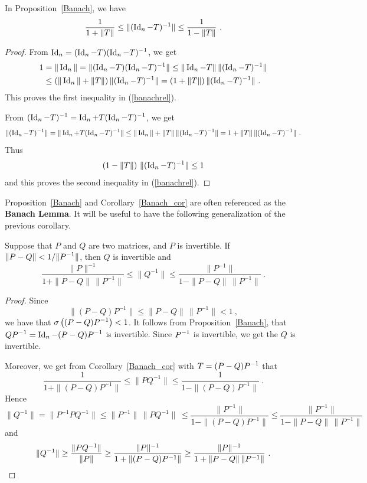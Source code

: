 \begin{cor}
In Proposition~\ref{Banach}, we have
\begin{equation}
\frac{1}{1+\|T\|} \leq \|(\operatorname{Id}_n-T)^{-1}\| \leq \frac{1}{1-\|T\|} \ .
\label{banachrel}
\end{equation}
\label{Banach_cor}
\end{cor}

\begin{proof}
From $\displaystyle \operatorname{Id}_n=(\operatorname{Id}_n-T)(\operatorname{Id}_n-T)^{-1}$, we get
\begin{align*}
1 &= \|\operatorname{Id}_n\| = \|(\operatorname{Id}_n-T)(\operatorname{Id}_n-T)^{-1}\| \leq
\|\operatorname{Id}_n-T\|\, \|(\operatorname{Id}_n-T)^{-1}\| \\
&\leq \left( \|\operatorname{Id}_n\|+\|T\| \right) \|(\operatorname{Id}_n-T)^{-1}\| 
= \left( 1 +\|T\| \right) \|(\operatorname{Id}_n-T)^{-1}\| \ .
\end{align*}
This proves the first inequality in (\ref{banachrel}).

From $\displaystyle (\operatorname{Id}_n-T)^{-1} = \operatorname{Id}_n + T (\operatorname{Id}_n - T)^{-1}$, we get
\[
\|(\operatorname{Id}_n-T)^{-1}\| = \|\operatorname{Id}_n + T (\operatorname{Id}_n - T)^{-1}\|
\leq \|\operatorname{Id}_n\| + \|T\|\,\|(\operatorname{Id}_n - T)^{-1}\|
= 1 + \|T\|\,\|(\operatorname{Id}_n - T)^{-1}\| \ .
\]
Thus
\[
\left(1 - \|T\|\right)\,\|(\operatorname{Id}_n-T)^{-1}\| \leq 1
\]
and this proves the second inequality in (\ref{banachrel}).
\end{proof}

Proposition~\ref{Banach} and Corollary~\ref{Banach_cor} are often
referenced as the {\bfseries Banach Lemma}.  It
will be useful to have the following generalization of the previous
corollary.

\begin{cor}
Suppose that $P$ and $Q$ are two \nn matrices, and $P$ is invertible.
If $\displaystyle \| P - Q \| < 1/\|P^{-1}\|$, then $Q$ is invertible
and
\[
\frac{\|P\|^{-1}}{1+\|P-Q\|\,\|P^{-1}\|} \leq \|Q^{-1}\| \leq
\frac{\|P^{-1}\|}{1-\|P-Q\|\,\|P^{-1}\|} \ .
\]
\label{Banach_corG}
\end{cor}

\begin{proof}
Since
\[
  \|(P-Q)P^{-1}\| \leq \| P-Q\|\,\|P^{-1}\| < 1 \ ,
\]
we have that $\displaystyle \sigma\left((P-Q)P^{-1}\right) < 1$.
It follows from Proposition~\ref{Banach}, that
$\displaystyle QP^{-1} = \operatorname{Id}_n - (P-Q)P^{-1}$ is invertible.
Since $\displaystyle P^{-1}$ is invertible, we get the $Q$ is invertible.

Moreover, we get from Corollary~\ref{Banach_cor} with
$\displaystyle T=(P-Q)P^{-1}$ that
\[
\frac{1}{1+\|(P-Q)P^{-1}\|} \leq \| P Q^{-1} \| \leq
\frac{1}{1-\|(P-Q)P^{-1}\|} \ .
\]
Hence
\[
\|Q^{-1}\| = \|P^{-1} P Q^{-1}\| \leq \|P^{-1}\|\,\|PQ^{-1}\|\,
\leq \frac{\|P^{-1}\|}{1-\|(P-Q)P^{-1}\|}
\leq \frac{\|P^{-1}\|}{1-\|P-Q\|\,\|P^{-1}\|}
\]
and
\[
\|Q^{-1}\| \geq \frac{\|PQ^{-1}\|}{\|P\|}
\geq \frac{\|P\|^{-1}}{1+\|(P-Q)P^{-1}\|}
\geq \frac{\|P\|^{-1}}{1+\|P-Q\|\,\|P^{-1}\|} \ . \qedhere
\]
\end{proof}

